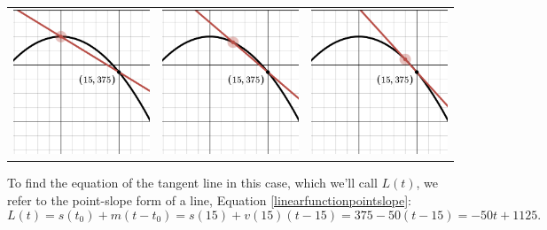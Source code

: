 \documentclass{ximera}
\begin{document}
\begin{center}

\begin{tabular}{ccc}

 \includegraphics[width=2in]{./IntroductiontoDerivativesGraphics/sectotan01.png} &  \includegraphics[width=2in]{./IntroductiontoDerivativesGraphics/sectotan03.png} &  \includegraphics[width=2in]{./IntroductiontoDerivativesGraphics/sectotan05.png} \\
 
 
 \end{tabular}
 
 \end{center}
 To find the equation of the tangent line in this case, which we'll call $L(t)$,  we refer to the point-slope form of a line, Equation \ref{linearfunctionpointslope}:  \[ L(t) = s\left(t_{0} \right)+ m \left(t-t_{0} \right) = s(15) + v(15)(t-15) = 375 - 50(t-15) = -50t+1125.\]
 
\end{document}
